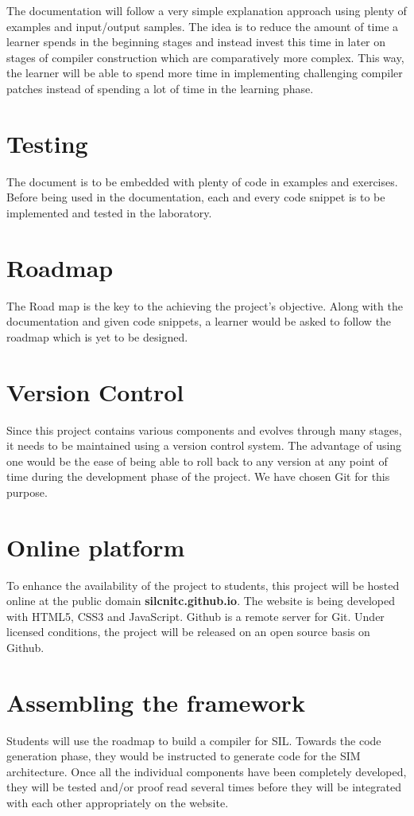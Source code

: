 The documentation will follow a very simple explanation approach using plenty of examples and input/output samples. The idea is to reduce the amount of time a learner spends in the beginning stages and instead invest this time in later on stages of compiler construction which are comparatively more complex. This way, the learner will be able to spend more time in implementing challenging compiler patches instead of spending a lot of time in the learning phase.


\section{Testing}

The document is to be embedded with plenty of code in examples and exercises. Before being used in the documentation, each and every code snippet is to be implemented and tested in the laboratory. 

\section{Roadmap}

The Road map is the key to the achieving the project's objective. Along with the documentation and given code snippets, a learner would be asked to follow the roadmap which is yet to be designed.
 
\section{Version Control}
Since this project contains various components and evolves through many stages, it needs to be maintained using a version control system. The advantage of using one would be the ease of  being able to roll back to any version at any point of time during the development phase of the project. We have chosen Git for this purpose.

\section{Online platform}
To enhance the availability of the project to students, this project will be hosted online at the public domain \textbf{silcnitc.github.io}. The website is being developed with HTML5, CSS3 and JavaScript. Github is a remote server for Git. Under licensed conditions, the project will be released on an open source basis on Github. 

\section{Assembling the framework}
Students will use the roadmap to build a compiler for SIL. Towards the code generation phase, they would be instructed to generate code for the SIM architecture\cite{citation-4-name-here}. Once all the individual components have been completely developed, they will be tested and/or proof read several times before they will be integrated with each other appropriately on the website.